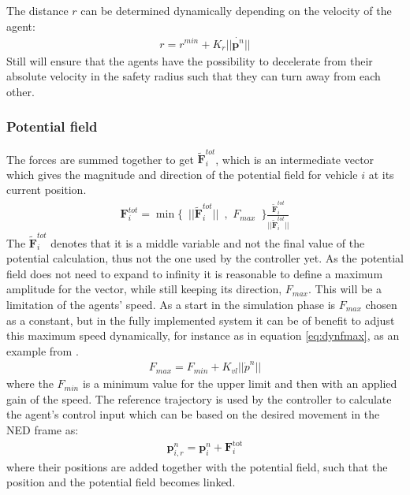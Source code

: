 \documentclass[a4paper,conference]{IEEEtran}
\begin{document}

The distance $r$ can be determined
dynamically depending on the velocity of the agent:
\begin{align}
r = r^{min} + K_r||\dot{\mathbf{p}^n}||
\end{align}
Still will ensure that the agents have the possibility to decelerate
from their absolute velocity in the safety radius such that they can
turn away from each other.


\subsubsection{Potential field}
The forces are summed together to get $\tilde{\mathbf{F}}_i^{tot}$,
which is an intermediate vector which gives the magnitude and
direction of the potential field for vehicle $i$ at its current
position.
\begin{align}
  \mathbf{F}_i^{tot} = \min\{\,\,\,||\tilde{\mathbf{F}}_i^{tot}||\,\,\,,\,\,F_{max}\,\,\,\}\frac{\tilde{\mathbf{F}}_i^{tot}}{||\tilde{\mathbf{F}}_i^{tot}||}
\end{align}
The $\tilde{\mathbf{F}}_i^{tot}$ denotes that it is a middle variable
and not the final value of the potential calculation, thus not the one
used by the controller yet.  As the potential field does not need to
expand to infinity it is reasonable to define a maximum amplitude for
the vector, while still keeping its direction, $F_{max}$. This will be
a limitation of the agents' speed. As a start in the simulation phase
is $F_{max}$ chosen as a constant, but in the fully implemented system
it can be of benefit to adjust this maximum speed dynamically, for
instance as in equation \ref{eq:dynfmax}, as an example from
\citep{UAVff3dpf}.
\begin{align}
F_{max} = F_{min} + K_{vl}||\dot{p}^n||
\label{eq:dynfmax}
\end{align}
where the $F_{min}$ is a minimum value for the upper limit and then
with an applied gain of the speed.  The reference trajectory is used
by the controller to calculate the agent's control input which can be
based on the desired movement in the NED frame as:
\begin{align}
  \mathbf{p}_{i,r}^n = \mathbf{p}_i^n + \mathbf{F}_i ^\text{tot}
\end{align}
where their positions are added together with the potential field,
such that the position and the potential field becomes linked.
\end{document}
